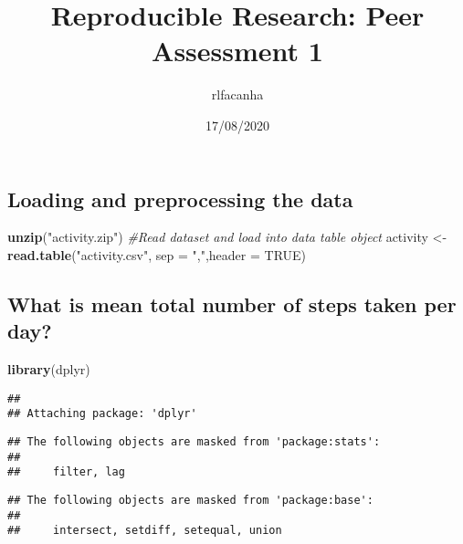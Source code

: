 \documentclass[
]{article}
\title{Reproducible Research: Peer Assessment 1}
\author{rlfacanha}
\date{17/08/2020}
\newenvironment{Shaded}{\begin{snugshade}}{\end{snugshade}}
\newcommand{\CommentTok}[1]{\textcolor[rgb]{0.56,0.35,0.01}{\textit{#1}}}
\newcommand{\DataTypeTok}[1]{\textcolor[rgb]{0.13,0.29,0.53}{#1}}
\newcommand{\KeywordTok}[1]{\textcolor[rgb]{0.13,0.29,0.53}{\textbf{#1}}}
\newcommand{\NormalTok}[1]{#1}
\newcommand{\OperatorTok}[1]{\textcolor[rgb]{0.81,0.36,0.00}{\textbf{#1}}}
\newcommand{\OtherTok}[1]{\textcolor[rgb]{0.56,0.35,0.01}{#1}}
\newcommand{\StringTok}[1]{\textcolor[rgb]{0.31,0.60,0.02}{#1}}
\begin{document}
\maketitle

\hypertarget{loading-and-preprocessing-the-data}{%
\subsection{Loading and preprocessing the
data}\label{loading-and-preprocessing-the-data}}

\begin{Shaded}
\begin{Highlighting}[]
\KeywordTok{unzip}\NormalTok{(}\StringTok{"activity.zip"}\NormalTok{)}
\CommentTok{#Read dataset and load into data table object}
\NormalTok{activity <-}\StringTok{ }\KeywordTok{read.table}\NormalTok{(}\StringTok{"activity.csv"}\NormalTok{, }\DataTypeTok{sep =} \StringTok{","}\NormalTok{,}\DataTypeTok{header =} \OtherTok{TRUE}\NormalTok{)}
\end{Highlighting}
\end{Shaded}

\hypertarget{what-is-mean-total-number-of-steps-taken-per-day}{%
\subsection{What is mean total number of steps taken per
day?}\label{what-is-mean-total-number-of-steps-taken-per-day}}

\begin{Shaded}
\begin{Highlighting}[]
\KeywordTok{library}\NormalTok{(dplyr)}
\end{Highlighting}
\end{Shaded}

\begin{verbatim}
## 
## Attaching package: 'dplyr'
\end{verbatim}

\begin{verbatim}
## The following objects are masked from 'package:stats':
## 
##     filter, lag
\end{verbatim}

\begin{verbatim}
## The following objects are masked from 'package:base':
## 
##     intersect, setdiff, setequal, union
\end{verbatim}

\begin{Shaded}
\end{Shaded}
\end{document}
